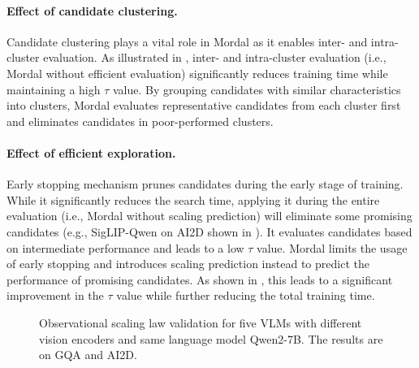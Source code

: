 \paragraph{Effect of candidate clustering.} Candidate clustering plays a vital role in Mordal as it enables inter- and intra-cluster evaluation. As illustrated in , inter- and intra-cluster evaluation (i.e., Mordal without efficient evaluation) significantly reduces training time while maintaining a high $\tau$ value. By grouping candidates with similar characteristics into clusters, Mordal evaluates representative candidates from each cluster first and eliminates candidates in poor-performed clusters.   


\paragraph{Effect of efficient exploration.} Early stopping mechanism prunes candidates during the early stage of training. While it significantly reduces the search time, applying it during the entire evaluation (i.e., Mordal without scaling prediction) will eliminate some promising candidates (e.g., SigLIP-Qwen on AI2D shown in ). It evaluates candidates based on intermediate performance and leads to a low $\tau$ value. Mordal limits the usage of early stopping and introduces scaling prediction instead to predict the performance of promising candidates. As shown in , this leads to a significant improvement in the $\tau$ value while further reducing the total training time. 

\begin{figure}[!t]
\centering
{}
{}

\caption{Observational scaling law validation for five VLMs with different vision encoders and same language model Qwen2-7B. The results are on GQA and AI2D. 
}
\label{fig:ablation_scaling}
\vspace{-4mm}
\end{figure}


